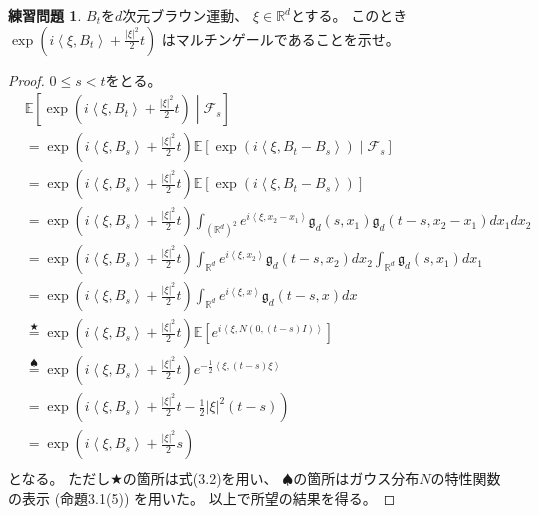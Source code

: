 \documentclass[uplatex]{jsarticle}
\theoremstyle{definition}
\newtheorem{prob}[prob]{練習問題}
\def\R{\mathbb{R}}
\def\E{\mathbb{E}}
\def\mcF{\mathcal{F}}
\begin{document}
\begin{prob}\label{prob: 3.7}
  \(B_t\)を\(d\)次元ブラウン運動、
  \(\xi \in \R^d\)とする。
  このとき
  \(\exp\left( i\left<\xi,B_t\right> + \frac{|\xi|^2}{2}t \right)\)
  はマルチンゲールであることを示せ。
\end{prob}

\begin{proof}
  \(0\leq s < t\)をとる。
  \begin{align*}
    &\E\left[ \exp\left( i\left<\xi,B_t\right> + \frac{|\xi|^2}{2}t \right)
    \middle| \mcF_s\right] \\
    &= \exp\left( i\left<\xi,B_s\right> + \frac{|\xi|^2}{2}t \right)
    \E\left[ \exp\left( i\left<\xi,B_t-B_s\right>
    \right) \middle| \mcF_s\right] \\
    &= \exp\left( i\left<\xi,B_s\right> + \frac{|\xi|^2}{2}t \right)
    \E\left[ \exp\left( i\left<\xi,B_t-B_s\right> \right)\right] \\
    &= \exp\left( i\left<\xi,B_s\right> + \frac{|\xi|^2}{2}t \right)
    \int_{(\R^d)^2}e^{i\left<\xi,x_2-x_1\right>}
    \mathfrak{g}_d(s,x_1)\mathfrak{g}_d(t-s,x_2-x_1)dx_1dx_2 \\
    &= \exp\left( i\left<\xi,B_s\right> + \frac{|\xi|^2}{2}t \right)
    \int_{\R^d}e^{i\left<\xi,x_2\right>}\mathfrak{g}_d(t-s,x_2)dx_2
    \int_{\R^d}\mathfrak{g}_d(s,x_1)dx_1 \\
    &= \exp\left( i\left<\xi,B_s\right> + \frac{|\xi|^2}{2}t \right)
    \int_{\R^d}e^{i\left<\xi,x\right>}\mathfrak{g}_d(t-s,x)dx \\
    &\overset{\bigstar}{=}
    \exp\left( i\left<\xi,B_s\right> + \frac{|\xi|^2}{2}t \right)
    \E\left[ e^{i\left<\xi,N(0,(t-s)I)\right>}\right] \\
    &\overset{\spadesuit}{=}
    \exp\left( i\left<\xi,B_s\right> + \frac{|\xi|^2}{2}t \right)
    e^{-\frac{1}{2}\left<\xi,(t-s)\xi\right>} \\
    &= \exp\left( i\left<\xi,B_s\right> + \frac{|\xi|^2}{2}t
    - \frac{1}{2}|\xi|^2(t-s) \right) \\
    &= \exp\left( i\left<\xi,B_s\right> + \frac{|\xi|^2}{2}s \right) \\
  \end{align*}
  となる。
  ただし\(\bigstar\)の箇所は式(3.2)を用い、
  \(\spadesuit\)の箇所はガウス分布\(N\)の特性関数の表示 (命題3.1(5)) を用いた。
  以上で所望の結果を得る。
\end{proof}
\end{document}
